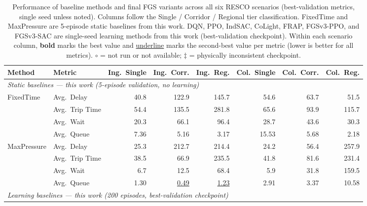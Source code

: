 \begin{table}
\centering
\caption{Performance of baseline methods and final FGS variants across all six RESCO scenarios (best-validation metrics, single seed unless noted). Columns follow the Single / Corridor / Regional tier classification. FixedTime and MaxPressure are 5-episode static baselines from this work. DQN, PPO, IndSAC, CoLight, FRAP, FGSv3-PPO, and FGSv3-SAC are single-seed learning methods from this work (best-validation checkpoint). Within each scenario column, \textbf{bold} marks the best value and \underline{underline} marks the second-best value per metric (lower is better for all metrics). $\circ$ = not run or not available; $\ddagger$ = physically inconsistent checkpoint.}
\label{tab:appendix_baselines}
\scriptsize
\setlength{\tabcolsep}{4pt}
\renewcommand{\arraystretch}{1.15}
\begin{tabular}{llrrrrrr}
\toprule
\textbf{Method} & \textbf{Metric}
  & \textbf{Ing.\ Single} & \textbf{Ing.\ Corr.}  & \textbf{Ing.\ Reg.}
  & \textbf{Col.\ Single} & \textbf{Col.\ Corr.}  & \textbf{Col.\ Reg.} \\
\midrule
\multicolumn{8}{l}{\textit{Static baselines --- this work (5-episode validation, no learning)}} \\[2pt]
\multirow{4}{*}{FixedTime}
  & Avg.\ Delay     &  40.8 & 122.9 & 145.7 &  54.6 &  63.7 &  51.5 \\
  & Avg.\ Trip Time &  54.4 & 135.5 & 281.8 &  65.6 &  93.9 & 115.7 \\
  & Avg.\ Wait      &  20.3 &  66.1 &  96.4 &  28.7 &  43.6 &  30.3 \\
  & Avg.\ Queue     &  7.36 &  5.16 &  3.17 & 15.53 &  5.68 &  2.18 \\[4pt]
\multirow{4}{*}{MaxPressure}
  & Avg.\ Delay     &  25.3 & 212.7 & 214.4 &  24.2 &  56.4 & 257.9 \\
  & Avg.\ Trip Time &  38.5 &  66.9 & 235.5 &  41.8 &  81.6 & 231.4 \\
  & Avg.\ Wait      &   6.7 &  12.5 &  68.4 &   5.9 &  31.8 & 159.5 \\
  & Avg.\ Queue     &  1.30 &  \underline{0.49} &  \underline{1.23} &  2.91 &  3.37 & 10.58 \\
\midrule
\multicolumn{8}{l}{\textit{Learning baselines --- this work (200 episodes, best-validation checkpoint)}} \\[2pt]

\end{tabular}
\end{table}
